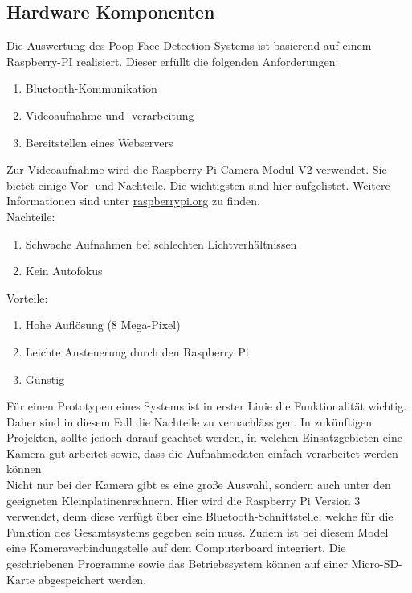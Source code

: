 \subsection{Hardware Komponenten}
\label{subsec:evalsys_hardware}

Die Auswertung des Poop-Face-Detection-Systems ist basierend auf einem Raspberry-PI realisiert. Dieser erfüllt die folgenden Anforderungen:

\begin{enumerate}
\item Bluetooth-Kommunikation
\item Videoaufnahme und -verarbeitung
\item Bereitstellen eines Webservers
\end{enumerate}

Zur Videoaufnahme wird die \glqq{}Raspberry Pi Camera Modul V2\grqq{}  verwendet. Sie bietet einige Vor- und Nachteile. Die wichtigsten sind hier aufgelistet. Weitere Informationen sind unter \href{https://www.raspberrypi.org/products/camera-module-v2/}{raspberrypi.org} zu finden. \\

Nachteile:
\begin{enumerate}
\item Schwache Aufnahmen bei schlechten Lichtverhältnissen
\item Kein Autofokus
\end{enumerate}
\vspace{0.35cm}

Vorteile:
\begin{enumerate}
\item Hohe Auflösung (8 Mega-Pixel)
\item Leichte Ansteuerung durch den Raspberry Pi
\item Günstig
\end{enumerate}

Für einen Prototypen eines Systems ist in erster Linie die Funktionalität wichtig. Daher sind in diesem Fall die Nachteile zu vernachlässigen. In zukünftigen Projekten, sollte jedoch darauf geachtet werden, in welchen Einsatzgebieten eine Kamera gut arbeitet sowie, dass die Aufnahmedaten einfach verarbeitet werden können. \\

Nicht nur bei der Kamera gibt es eine große Auswahl, sondern auch unter den geeigneten Kleinplatinenrechnern. Hier wird die Raspberry Pi Version 3 verwendet, denn diese verfügt über eine Bluetooth-Schnittstelle, welche für die Funktion des Gesamtsystems gegeben sein muss. Zudem ist bei diesem Model eine Kameraverbindungstelle auf dem Computerboard integriert. Die geschriebenen Programme sowie das Betriebssystem können auf einer Micro-SD-Karte abgespeichert werden.\cite{raspi_datenblatt}


